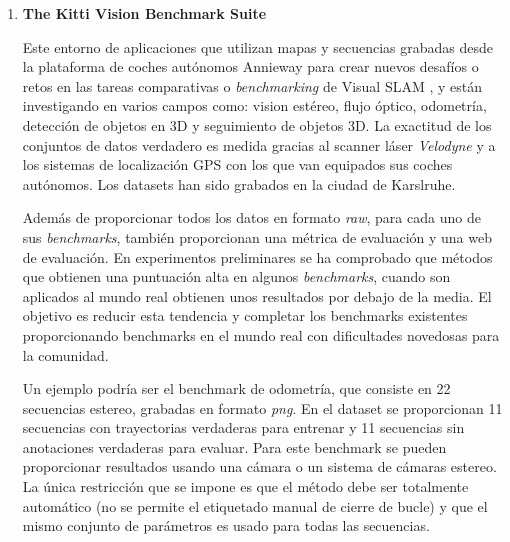 \begin {enumerate}
SLAMBench está siendo una herramienta muy útil en robótica y Sistemas de Realidad Aumentada (AR). Aunque un gran número de algoritmos SLAM han sido presentados, no se ha investigado lo suficiente para tratar de unificar el interface de estos algoritmos, o realizar comparaciones de todas sus capacidades en conjunto. Esto presenta un problema ya que diferentes aplicaciones SLAM pueden tener diferentes requisitos funcionales y no funcionales. Por ejemplo, una solución para Realidad Aumentada desarrollada para móviles tendría que optimizar el consumo de energía, mientras que otra solución diseñada para vehículos de navegación autónoma estaría enfocada a funcionar con la mayor exactitud posible. SLAMBench2 es una herramienta de evaluación que compararía sistemas SLAM actuales y futuros, utilizando una lista extensible de datasets, mientras utiliza una lista comparable de métricas de rendimiento. SLAMBench2 es un software que está disponible de manera pública.\footnote{https://github.com/pamela-project/slambench2} 

\item \textbf{The Kitti Vision Benchmark Suite }

Este entorno de aplicaciones que utilizan mapas y secuencias grabadas desde la plataforma de coches autónomos Annieway \cite{AnnieWay08} para crear nuevos desafíos o retos en las tareas comparativas o \textit{benchmarking} de Visual SLAM \cite{Geiger2012CVPR}, y están investigando en varios campos como: vision estéreo, flujo óptico, odometría, detección de objetos en 3D y seguimiento de objetos 3D.
La exactitud de los conjuntos de datos verdadero es medida gracias al scanner láser \textit{Velodyne} y a los sistemas de localización GPS con los que van equipados sus coches autónomos.
Los datasets han sido grabados en la ciudad de Karslruhe.

Además de proporcionar todos los datos en formato \textit{raw}, para cada uno de sus \textit{benchmarks}, también proporcionan una métrica de evaluación y una web de evaluación. En experimentos preliminares se ha comprobado que métodos que obtienen una puntuación alta en algunos \textit{benchmarks}, cuando son aplicados al mundo real obtienen unos resultados por debajo de la media. El objetivo es reducir esta tendencia y completar los benchmarks existentes proporcionando benchmarks en el mundo real con dificultades novedosas para la comunidad. 

Un ejemplo podría ser el benchmark de odometría, que consiste en 22 secuencias estereo, grabadas en formato \textit{png}. En el dataset se proporcionan 11 secuencias con trayectorias verdaderas para entrenar y 11 secuencias sin anotaciones verdaderas para evaluar. Para este benchmark se pueden proporcionar resultados usando una cámara o un sistema de cámaras estereo.
La única restricción que se impone es que el método debe ser totalmente automático (no se permite el etiquetado manual de cierre de bucle) y que el mismo conjunto de parámetros es usado para todas las secuencias.


\end{enumerate}
